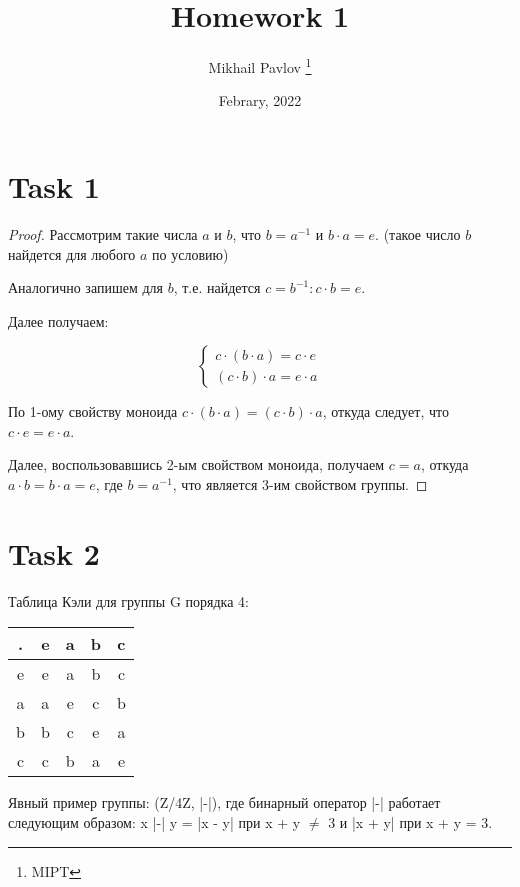 \documentclass[12pt, a4paper]{article}
\title{Homework 1}
\author{Mikhail Pavlov \thanks{MIPT}}
\date{Febrary, 2022}
\begin{document}
\section*{Task 1}

\begin{proof}
    Рассмотрим такие числа $a$ и $b$, что $b = a^{-1}$ и $b \cdot a = e$. (такое число $b$ найдется для любого $a$ по условию)

    Аналогично запишем для $b$, т.е. найдется $c = b^{-1} : c \cdot b = e$. 

    Далее получаем:

    \begin{equation*}
        \begin{cases}
            c \cdot (b \cdot a) = c \cdot e \\
            (c \cdot b) \cdot a = e \cdot a    
        \end{cases}
    \end{equation*}
    
    По 1-ому свойству моноида $c \cdot (b \cdot a) = (c \cdot b) \cdot a$, откуда следует, что $c \cdot e = e \cdot a$.

    Далее, воспользовавшись 2-ым свойством моноида, получаем $c = a$, откуда $a \cdot b = b \cdot a = e$, где $b = a^{-1}$,
    что является 3-им свойством группы.
\end{proof}

\section*{Task 2}

Таблица Кэли для группы G порядка 4:

\begin{center}
    \begin{tabular}{ | c | c | c | c | c | }
        \hline
        . & e & a & b & c \\ \hline
        e & e & a & b & c \\ \hline
        a & a & e & c & b \\ \hline
        b & b & c & e & a \\ \hline
        c & c & b & a & e \\ \hline
    \end{tabular}
\end{center} 

Явный пример группы: (Z/4Z, |-|), где бинарный оператор |-| работает следующим образом: x |-| y = |x - y| при x + y $\neq$ 3 и |x + y| при x + y = 3. 
\end{document}
